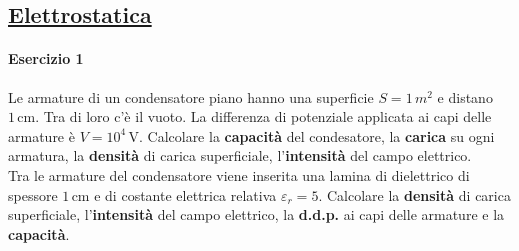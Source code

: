\subsection*{\hyperref[sec:elettrostatica]{Elettrostatica}}\label{ex:elettrostatica}
\paragraph{Esercizio 1}
Le armature di un condensatore piano hanno una superficie $S = 1\,m^2$ e distano $1\,\text{cm}$. Tra 
di loro c'è il vuoto. La differenza di potenziale applicata ai capi delle armature è $V = 
10^4\,\text{V}$. Calcolare la \textbf{capacità} del condesatore, la \textbf{carica} su ogni armatura, 
la \textbf{densità} di carica superficiale, l'\textbf{intensità} del campo elettrico.\\
Tra le armature del condensatore viene inserita una lamina di dielettrico di spessore $1\,\text{cm}$ 
e di costante elettrica relativa $\varepsilon_r = 5$. Calcolare la \textbf{densità} di carica 
superficiale, l'\textbf{intensità} del campo elettrico, la \textbf{d.d.p.} ai capi delle armature e 
la \textbf{capacità}.
\divisor

